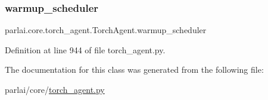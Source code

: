 \subsubsection{\texorpdfstring{warmup\+\_\+scheduler}{warmup\_scheduler}}
{\footnotesize\ttfamily parlai.\+core.\+torch\+\_\+agent.\+Torch\+Agent.\+warmup\+\_\+scheduler}



Definition at line 944 of file torch\+\_\+agent.\+py.



The documentation for this class was generated from the following file\+:\begin{DoxyCompactItemize}
\item 
parlai/core/\hyperlink{torch__agent_8py}{torch\+\_\+agent.\+py}\end{DoxyCompactItemize}
